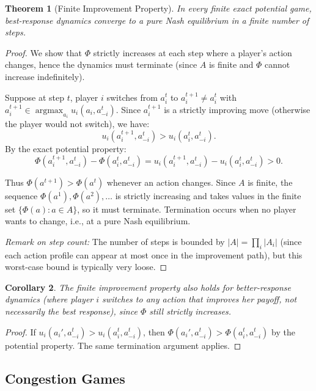 \documentclass[11pt,a4paper]{article}
\theoremstyle{definition}
\theoremstyle{plain}
\newtheorem{theorem}{Theorem}[section]
\newtheorem{corollary}[theorem]{Corollary}
\theoremstyle{remark}
\DeclareMathOperator{\argmax}{argmax}
\begin{document}
\begin{theorem}[Finite Improvement Property]
\label{thm:fip}
In every finite exact potential game, best-response dynamics converge to a pure Nash
equilibrium in a finite number of steps.
\end{theorem}

\begin{proof}
We show that $\Phi$ strictly increases at each step where a player's action changes, hence
the dynamics must terminate (since $A$ is finite and $\Phi$ cannot increase indefinitely).

Suppose at step $t$, player $i$ switches from $a_i^t$ to $a_i^{t+1} \neq a_i^t$ with
$a_i^{t+1} \in \argmax_{a_i} u_i(a_i, a_{-i}^t)$. Since $a_i^{t+1}$ is a strictly
improving move (otherwise the player would not switch), we have:
\[
    u_i(a_i^{t+1}, a_{-i}^t) > u_i(a_i^t, a_{-i}^t).
\]
By the exact potential property:
\[
    \Phi(a_i^{t+1}, a_{-i}^t) - \Phi(a_i^t, a_{-i}^t)
    = u_i(a_i^{t+1}, a_{-i}^t) - u_i(a_i^t, a_{-i}^t) > 0.
\]

Thus $\Phi(a^{t+1}) > \Phi(a^t)$ whenever an action changes. Since $A$ is finite, the
sequence $\Phi(a^1), \Phi(a^2), \ldots$ is strictly increasing and takes values in the
finite set $\{\Phi(a) : a \in A\}$, so it must terminate. Termination occurs when no player
wants to change, i.e., at a pure Nash equilibrium.

\emph{Remark on step count:} The number of steps is bounded by $|A| = \prod_i |A_i|$
(since each action profile can appear at most once in the improvement path), but this
worst-case bound is typically very loose.
\end{proof}

\begin{corollary}
\label{cor:better-response}
The finite improvement property also holds for \emph{better-response dynamics} (where
player $i$ switches to any action that improves her payoff, not necessarily the best
response), since $\Phi$ still strictly increases.
\end{corollary}

\begin{proof}
If $u_i(a_i', a_{-i}^t) > u_i(a_i^t, a_{-i}^t)$, then
$\Phi(a_i', a_{-i}^t) > \Phi(a_i^t, a_{-i}^t)$ by the potential property. The same
termination argument applies.
\end{proof}

\subsection{Congestion Games}
\end{document}
